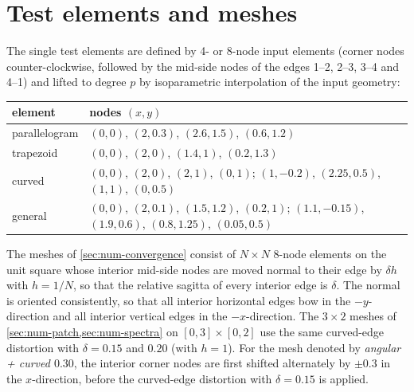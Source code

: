 \appendix
{}
%
\section{Test elements and meshes}
\label{app:elements}
%
The single test elements are defined by 4- or 8-node input elements (corner nodes counter-clockwise, followed by the mid-side nodes of the edges 1--2, 2--3, 3--4 and 4--1) and lifted to degree $p$ by isoparametric interpolation of the input geometry:
\begin{center}
  \small
  \begin{tabular}{@{}ll@{}}
    \toprule
    element & nodes $(x,y)$ \\
    \midrule
    parallelogram & $(0,0)$, $(2,0.3)$, $(2.6,1.5)$, $(0.6,1.2)$ \\
    trapezoid & $(0,0)$, $(2,0)$, $(1.4,1)$, $(0.2,1.3)$ \\
    curved & $(0,0)$, $(2,0)$, $(2,1)$, $(0,1)$; $(1,-0.2)$, $(2.25,0.5)$, $(1,1)$, $(0,0.5)$ \\
    general & $(0,0)$, $(2,0.1)$, $(1.5,1.2)$, $(0.2,1)$; $(1.1,-0.15)$, $(1.9,0.6)$, $(0.8,1.25)$, $(0.05,0.5)$ \\
    \bottomrule
  \end{tabular}
\end{center}
The meshes of \cref{sec:num-convergence} consist of $N\times N$ 8-node elements on the unit square whose interior mid-side nodes are moved normal to their edge by $\delta h$ with $h=1/N$, so that the relative sagitta of every interior edge is $\delta$. The normal is oriented consistently, so that all interior horizontal edges bow in the $-y$-direction and all interior vertical edges in the $-x$-direction. The $3\times2$ meshes of \cref{sec:num-patch,sec:num-spectra} on $[0,3]\times[0,2]$ use the same curved-edge distortion with $\delta=0.15$ and $0.20$ (with $h=1$). For the mesh denoted by \emph{angular + curved $0.30$}, the interior corner nodes are first shifted alternately by $\pm0.3$ in the $x$-direction, before the curved-edge distortion with $\delta=0.15$ is applied.
%
